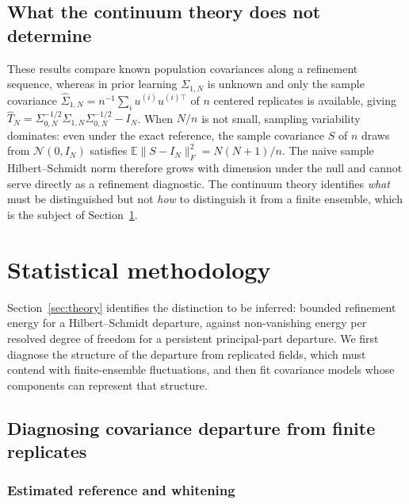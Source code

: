 \documentclass[11pt]{article}
\numberwithin{table}{section}
\numberwithin{figure}{section}
\begin{document}
\subsection{What the continuum theory does not determine}
\label{sec:handoff}

These results compare known population covariances along a refinement sequence, whereas in prior learning $\Sigma_{1,N}$ is unknown and only the sample covariance $\widehat\Sigma_{1,N}=n^{-1}\sum_{i}u^{(i)}u^{(i)\top}$ of $n$ centered replicates is available, giving $\widehat T_N=\Sigma_{0,N}^{-1/2}\widehat\Sigma_{1,N}\Sigma_{0,N}^{-1/2}-I_N$. When $N/n$ is not small, sampling variability dominates: even under the exact reference, the sample covariance $S$ of $n$ draws from $\mathcal N(0,I_N)$ satisfies $\mathbb E\|S-I_N\|_F^2=N(N+1)/n$. The naive sample Hilbert--Schmidt norm therefore grows with dimension under the null and cannot serve directly as a refinement diagnostic. The continuum theory identifies \emph{what} must be distinguished but not \emph{how} to distinguish it from a finite ensemble, which is the subject of Section~\ref{sec:methods}.

\section{Statistical methodology}
\label{sec:methods}

Section~\ref{sec:theory} identifies the distinction to be inferred: bounded refinement energy for a Hilbert--Schmidt departure, against non-vanishing energy per resolved degree of freedom for a persistent principal-part departure. We first diagnose the structure of the departure from replicated fields, which must contend with finite-ensemble fluctuations, and then fit covariance models whose components can represent that structure.

\subsection{Diagnosing covariance departure from finite replicates}
\label{sec:diagnostic}

\subsubsection{Estimated reference and whitening}
\label{sec:estimated_reference}
\end{document}
